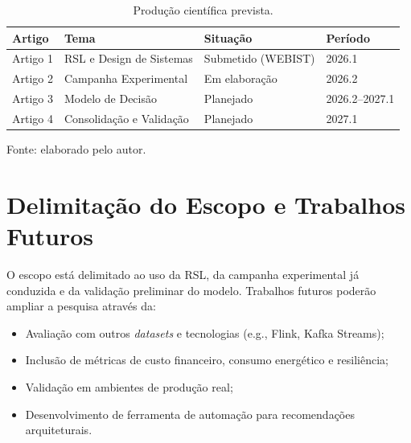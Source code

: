\begin{table}[htbp]
\centering
\caption{Produção científica prevista.}
\label{tab:producao-cientifica}
\small
\begin{tabular}{llll}
\toprule
\textbf{Artigo} & \textbf{Tema} & \textbf{Situação} & \textbf{Período} \\
\midrule
Artigo 1 & RSL e Design de Sistemas & Submetido (WEBIST) & 2026.1 \\
Artigo 2 & Campanha Experimental & Em elaboração & 2026.2 \\
Artigo 3 & Modelo de Decisão & Planejado & 2026.2--2027.1 \\
Artigo 4 & Consolidação e Validação & Planejado & 2027.1 \\
\bottomrule
\end{tabular}
\vspace{0.3em}
\begin{flushleft}
\footnotesize Fonte: elaborado pelo autor.
\end{flushleft}
\end{table}

\section{Delimitação do Escopo e Trabalhos Futuros}
\label{sec:escopo-trabalhos-futuros}
O escopo está delimitado ao uso da RSL, da campanha experimental já conduzida e da validação preliminar do modelo. Trabalhos futuros poderão ampliar a pesquisa através da:
\begin{itemize}
    \item Avaliação com outros \textit{datasets} e tecnologias (e.g., Flink, Kafka Streams);
    \item Inclusão de métricas de custo financeiro, consumo energético e resiliência;
    \item Validação em ambientes de produção real;
    \item Desenvolvimento de ferramenta de automação para recomendações arquiteturais.
\end{itemize}